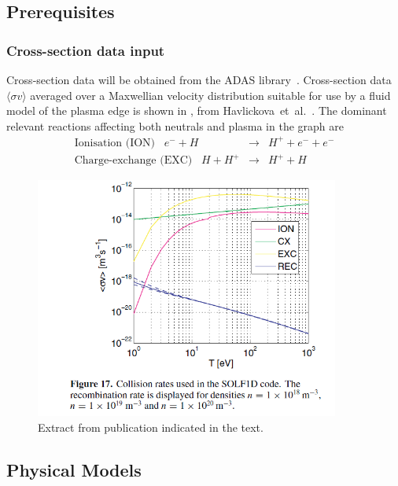 \subsection{Prerequisites}\label{sec:33prereq}
\subsubsection{Cross-section data input}\label{sec:xsect}
Cross-section data will be obtained from the ADAS library~\cite{adaswebsite}.
Cross-section data $\langle\sigma v\rangle$ averaged over a Maxwellian velocity distribution suitable for
use by a fluid model of the plasma edge is shown in , from Havlickova~et~al.~\cite{Ha13Benc}.
The dominant relevant reactions affecting both neutrals and plasma in the graph are
\begin{eqnarray}
\mbox{Ionisation (ION)} \;\;\; e^-+ H &\rightarrow& H^+ + e^-+ e^-\\
\mbox{Charge-exchange (EXC)} \;\;\; H + H^+ &\rightarrow& H^+ + H
\end{eqnarray}
\begin{figure}
\centerline{\includegraphics[width=10cm]{../png/Ha13Benc_xsects.png}}
\caption{Extract from publication indicated in the text.  \label{fig:xsects}}
\end{figure}

\subsection{Physical Models}\label{sec:models}
